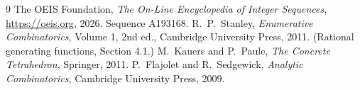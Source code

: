 \documentclass[11pt,a4paper]{article}
\theoremstyle{plain}
\theoremstyle{definition}
\begin{document}
\begin{thebibliography}{9}
 The OEIS Foundation, \emph{The On-Line Encyclopedia of Integer
Sequences}, \url{https://oeis.org}, 2026. Sequence A193168.
 R.~P.~Stanley, \emph{Enumerative Combinatorics}, Volume 1, 2nd ed.,
Cambridge University Press, 2011. (Rational generating functions, Section 4.1.)
 M.~Kauers and P.~Paule, \emph{The Concrete Tetrahedron}, Springer, 2011.
 P.~Flajolet and R.~Sedgewick, \emph{Analytic Combinatorics}, Cambridge
University Press, 2009.
\end{thebibliography}
\end{document}
